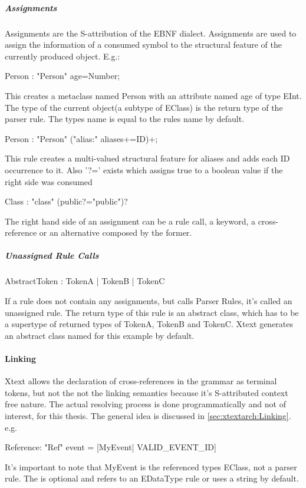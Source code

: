 \subparagraph{Assignments}
Assignments are the S-attribution of the EBNF dialect. Assignments are used to assign the information of a consumed symbol to the structural feature of the currently produced object. E.g.:
\begin{xtxt}
Person : "Person" age=Number;
\end{xtxt}
This creates a metaclass named Person with an attribute named age of type EInt. 
The type of the current object(a subtype of EClass) is the return type of the parser rule. The types name is equal to the rules name by default.
\begin{xtxt}
Person : "Person" ("alias:" aliases+=ID)+;
\end{xtxt}
This rule creates a multi-valued structural feature for aliases and adds each ID occurrence to it. Also '?=' exists which assigns true to a boolean value if the right side was consumed
\begin{xtxt}
Class : "class" (public?="public")?
\end{xtxt}

The right hand side of an assignment can be a rule call, a keyword, a cross-reference or an alternative composed by the former.

\subparagraph{Unassigned Rule Calls}
\begin{xtxt}
AbstractToken :	TokenA |	TokenB |	TokenC
\end{xtxt}
If a rule does not contain any assignments, but calls Parser Rules, it's called an unassigned rule. The return type of this rule is an abstract class, which has to be a supertype of returned types of TokenA, TokenB and TokenC. Xtext generates an abstract class named  for this example by default.

\paragraph{Linking}
Xtext allows the declaration of cross-references in the grammar as terminal tokens, but not the not the linking semantics because it's S-attributed context free nature. The actual resolving process is done programmatically and not of interest, for this thesis. The general idea is discussed in \ref{sec:xtextarch:Linking}.
e.g. 
\begin{xtxt}
Reference:  "Ref" event = [MyEvent| VALID_EVENT_ID]
\end{xtxt}
It's important to note that MyEvent is the referenced types EClass, not a parser rule. The   is optional and refers to an EDataType rule or uses a string by default.

